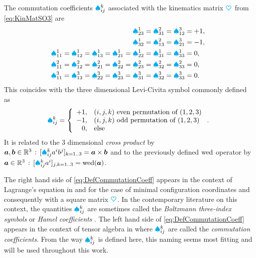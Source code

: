 \begin{Example}%
The commutation coefficients $\textcolor{cyan}{\spadesuit}^{k}_{ij}$ associated with the kinematics matrix $\boldsymbol{\textcolor{cyan}{\heartsuit}}$ from \eqref{eq:KinMatSO3} are
\begin{align*}
 \textcolor{cyan}{\spadesuit}^{1}_{23} = \textcolor{cyan}{\spadesuit}^{2}_{31} = \textcolor{cyan}{\spadesuit}^{3}_{12} &= +1,
\\
 \textcolor{cyan}{\spadesuit}^{1}_{32} = \textcolor{cyan}{\spadesuit}^{2}_{13} = \textcolor{cyan}{\spadesuit}^{3}_{21} &= -1,
\\
 \textcolor{cyan}{\spadesuit}^{1}_{11} = \textcolor{cyan}{\spadesuit}^{1}_{12} = \textcolor{cyan}{\spadesuit}^{1}_{13} = \textcolor{cyan}{\spadesuit}^{1}_{21} = \textcolor{cyan}{\spadesuit}^{1}_{22} = \textcolor{cyan}{\spadesuit}^{1}_{31} = \textcolor{cyan}{\spadesuit}^{1}_{33} &= 0,
\\
 \textcolor{cyan}{\spadesuit}^{2}_{11} = \textcolor{cyan}{\spadesuit}^{2}_{12} = \textcolor{cyan}{\spadesuit}^{2}_{21} = \textcolor{cyan}{\spadesuit}^{2}_{22} = \textcolor{cyan}{\spadesuit}^{2}_{23} = \textcolor{cyan}{\spadesuit}^{2}_{32} = \textcolor{cyan}{\spadesuit}^{2}_{33} &= 0,
\\
 \textcolor{cyan}{\spadesuit}^{3}_{11} = \textcolor{cyan}{\spadesuit}^{3}_{13} = \textcolor{cyan}{\spadesuit}^{3}_{22} = \textcolor{cyan}{\spadesuit}^{3}_{23} = \textcolor{cyan}{\spadesuit}^{3}_{31} = \textcolor{cyan}{\spadesuit}^{3}_{32} = \textcolor{cyan}{\spadesuit}^{3}_{33} &= 0.
\end{align*}
This coincides with the three dimensional Levi-Civita symbol commonly defined as
\begin{align}\label{eq:BoltzmannSymSattelite}
 \BoltzSym{\LidxIII}{\LidxI}{\LidxII} =
 \left\{
 \begin{array}{rl}
  +1, & (\LidxI,\LidxII,\LidxIII) \ \text{even permutation of} \ (1,2,3) \\
  -1, & (\LidxI,\LidxII,\LidxIII) \ \text{odd permutation of} \ (1,2,3) \\
  0, & \text{else}
 \end{array}
 \right.
 .
\end{align}
It is related to the 3 dimensional \textit{cross product} by $\boldsymbol{a}, \boldsymbol{b} \in \mathbb{R}^3 \, : \, [\textcolor{cyan}{\spadesuit}^{k}_{ij} a^{i} b^{j}]_{k=1..3} = \boldsymbol{a} \times \boldsymbol{b}$ and to the previously defined $\operatorname{wed}$ operator by $\boldsymbol{a} \in \mathbb{R}^3 \, : \, [\textcolor{cyan}{\spadesuit}^{k}_{ij} a^{i}]_{j,k=1..3} = \operatorname{wed}(\boldsymbol{a})$.
\end{Example}

The right hand side of \eqref{eq:DefCommutationCoeff} appears in the context of Lagrange's equation in \cite[p.\ 687]{Boltzmann:NonholCoord} and \cite[p.\ 10]{Hamel:LagrangeEuler} for the case of minimal configuration coordinates and consequently with a square matrix $\boldsymbol{\textcolor{cyan}{\heartsuit}}$.
In the contemporary literature on this context, the quantities $\textcolor{cyan}{\spadesuit}^{k}_{ij}$ are sometimes called the \textit{Boltzmann three-index symbols} \cite[sec.\,1.8]{Lurie:AnalyticalMechanics} or \textit{Hamel coefficients} \cite[p.\,75]{Bremer:ElasticMultibodyDynamics}.
The left hand side of \eqref{eq:DefCommutationCoeff} appears in the context of tensor algebra in \cite[Box 8.4]{Misner:Gravitation} where $\textcolor{cyan}{\spadesuit}^{k}_{ij}$ are called the \textit{commutation coefficients}.
From the way $\textcolor{cyan}{\spadesuit}^{k}_{ij}$ is defined here, this naming seems most fitting and will be used throughout this work. 

